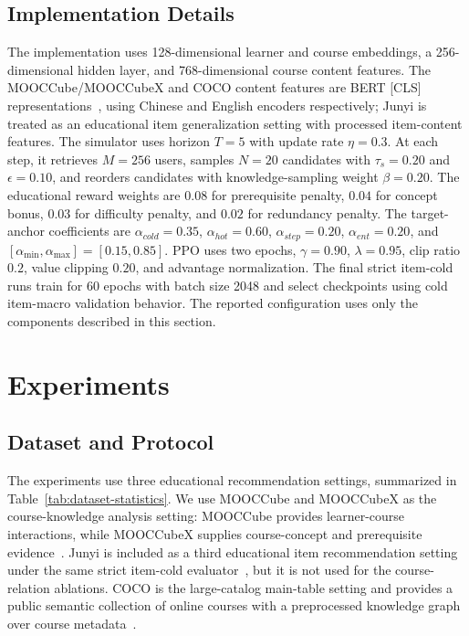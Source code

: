 \documentclass[sigconf,anonymous,review]{acmart}
\begin{document}
\subsection{Implementation Details}
The implementation uses 128-dimensional learner and course embeddings, a 256-dimensional hidden layer, and 768-dimensional course content features. The MOOCCube/MOOCCubeX and COCO content features are BERT [CLS] representations~\cite{devlin2019bert}, using Chinese and English encoders respectively; Junyi is treated as an educational item generalization setting with processed item-content features. The simulator uses horizon \(T=5\) with update rate \(\eta=0.3\). At each step, it retrieves \(M=256\) users, samples \(N=20\) candidates with \(\tau_s=0.20\) and \(\epsilon=0.10\), and reorders candidates with knowledge-sampling weight \(\beta=0.20\). The educational reward weights are \(0.08\) for prerequisite penalty, \(0.04\) for concept bonus, \(0.03\) for difficulty penalty, and \(0.02\) for redundancy penalty. The target-anchor coefficients are \(\alpha_{cold}=0.35\), \(\alpha_{hot}=0.60\), \(\alpha_{step}=0.20\), \(\alpha_{ent}=0.20\), and \([\alpha_{\min},\alpha_{\max}]=[0.15,0.85]\). PPO uses two epochs, \(\gamma=0.90\), \(\lambda=0.95\), clip ratio \(0.2\), value clipping \(0.20\), and advantage normalization. The final strict item-cold runs train for 60 epochs with batch size 2048 and select checkpoints using cold item-macro validation behavior. The reported configuration uses only the components described in this section.

\section{Experiments}
\subsection{Dataset and Protocol}
The experiments use three educational recommendation settings, summarized in Table~\ref{tab:dataset-statistics}. We use MOOCCube and MOOCCubeX as the course-knowledge analysis setting: MOOCCube provides learner-course interactions, while MOOCCubeX supplies course-concept and prerequisite evidence~\cite{yu2020mooccube,wang2021mooccubex}. Junyi is included as a third educational item recommendation setting under the same strict item-cold evaluator~\cite{chen2020junyi}, but it is not used for the course-relation ablations. COCO is the large-catalog main-table setting and provides a public semantic collection of online courses with a preprocessed knowledge graph over course metadata~\cite{dessi2018coco}.
\end{document}
